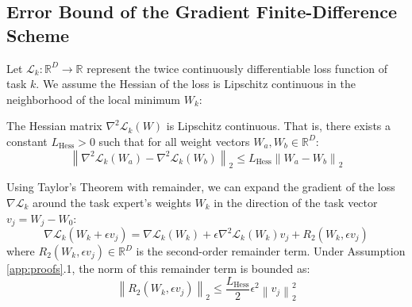 \subsection{Error Bound of the Gradient Finite-Difference Scheme}
Let $\mathcal{L}_k : \mathbb{R}^D \to \mathbb{R}$ represent the twice continuously differentiable loss function of task $k$. We assume the Hessian of the loss is Lipschitz continuous in the neighborhood of the local minimum $W_k$:

\begin{assumption}
    The Hessian matrix $\nabla^2 \mathcal{L}_k(W)$ is Lipschitz continuous. That is, there exists a constant $L_{\text{Hess}} > 0$ such that for all weight vectors $W_a, W_b \in \mathbb{R}^D$:
    \begin{equation}
        \left\| \nabla^2 \mathcal{L}_k(W_a) - \nabla^2 \mathcal{L}_k(W_b) \right\|_2 \le L_{\text{Hess}} \left\| W_a - W_b \right\|_2
    \end{equation}
\end{assumption}

Using Taylor's Theorem with remainder, we can expand the gradient of the loss $\nabla \mathcal{L}_k$ around the task expert's weights $W_k$ in the direction of the task vector $v_j = W_j - W_0$:
\begin{equation}
    \nabla \mathcal{L}_k(W_k + \epsilon v_j) = \nabla \mathcal{L}_k(W_k) + \epsilon \nabla^2 \mathcal{L}_k(W_k) v_j + R_2(W_k, \epsilon v_j)
\label{eq:taylor_grad}
\end{equation}
where $R_2(W_k, \epsilon v_j) \in \mathbb{R}^D$ is the second-order remainder term. Under Assumption \ref{app:proofs}.1, the norm of this remainder term is bounded as:
\begin{equation}
    \left\| R_2(W_k, \epsilon v_j) \right\|_2 \le \frac{L_{\text{Hess}}}{2} \epsilon^2 \left\| v_j \right\|_2^2
\label{eq:remainder_bound}
\end{equation}

